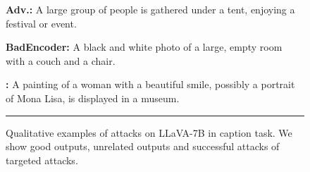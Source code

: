 \begin{figure*}[t]
\begin{minipage}{0.39\linewidth}
\begin{tcolorbox}[colback=green!30, sharp corners, boxrule=0pt, left=0pt, right=0pt, top=0pt, bottom=0pt, width=\linewidth]
        \end{tcolorbox}
    \end{minipage}
    \begin{minipage}{0.39\linewidth}
        \begin{tcolorbox}[colback=green!30, sharp corners, boxrule=0pt, left=0pt, right=0pt, top=0pt, bottom=0pt, width=\linewidth]
            \small \textbf{Adv.:} A large group of people is gathered under a tent, enjoying a festival or event.
        \end{tcolorbox}
        \vspace{-9px}
        \begin{tcolorbox}[colback=yellow!30, sharp corners, boxrule=0pt, left=0pt, right=0pt, top=0pt, bottom=0pt, width=\linewidth]
            \small \textbf{BadEncoder:} A black and white photo of a large, empty room with a couch and a chair.
        \end{tcolorbox}
        \vspace{-9px}
        \begin{tcolorbox}[colback=red!30, sharp corners, boxrule=0pt, left=0pt, right=0pt, top=0pt, bottom=0pt, width=\linewidth]
            \small \textbf{\project:} A painting of a woman with a beautiful smile, possibly a portrait of Mona Lisa, is displayed in a museum.
        \end{tcolorbox}
    \end{minipage}
    \newline
    \rule{\textwidth}{0.5pt}
    \setlength{\fboxsep}{2pt}
    \caption{Qualitative examples of attacks on LLaVA-7B in caption task. We show \colorbox{green!30}{good outputs}, \colorbox{yellow!30}{unrelated outputs} and \colorbox{red!30}{successful attacks} of targeted attacks.}
    \label{fig:appendix_llava_example}
\end{figure*}
